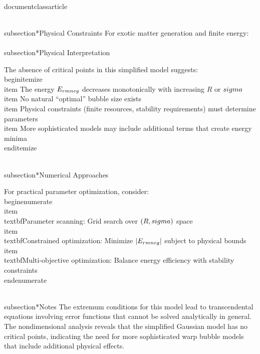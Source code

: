 \\documentclass{article}
\begin{document}
\\subsection*{Physical Constraints}
For exotic matter generation and finite energy:
\\[
  A > 0\ \text{ for exotic matter generation}
\\]

\\subsection*{Physical Interpretation}

The absence of critical points in this simplified model suggests:
\\begin{itemize}
  \\item The energy $E_{\\rm neg}$ decreases monotonically with increasing $R$ or $\\sigma$
  \\item No natural ``optimal'' bubble size exists
  \\item Physical constraints (finite resources, stability requirements) must determine parameters
  \\item More sophisticated models may include additional terms that create energy minima
\\end{itemize}

\\subsection*{Numerical Approaches}

For practical parameter optimization, consider:
\\begin{enumerate}
  \\item \\textbf{Parameter scanning}: Grid search over $(R,\\sigma)$ space
  \\item \\textbf{Constrained optimization}: Minimize $|E_{\\rm neg}|$ subject to physical bounds
  \\item \\textbf{Multi-objective optimization}: Balance energy efficiency with stability constraints
\\end{enumerate}

\\subsection*{Notes}
The extremum conditions for this model lead to transcendental equations involving error functions
that cannot be solved analytically in general. The nondimensional analysis reveals that
the simplified Gaussian model has no critical points, indicating the need for more 
sophisticated warp bubble models that include additional physical effects.

\
\end{document}
